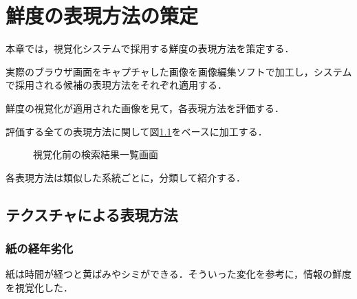 \chapter{鮮度の表現方法の策定}
\label{chap:verification}

本章では，視覚化システムで採用する鮮度の表現方法を策定する．

実際のブラウザ画面をキャプチャした画像を画像編集ソフトで加工し，システムで採用される候補の表現方法をそれぞれ適用する．

鮮度の視覚化が適用された画像を見て，各表現方法を評価する．

\newpage

評価する全ての表現方法に関して図\ref{fig:ver-base}をベースに加工する．

\begin{figure}[htbp]
  \begin{center}
  \end{center}
  \caption{視覚化前の検索結果一覧画面}
  \label{fig:ver-base}
\end{figure}

各表現方法は類似した系統ごとに，分類して紹介する．

\section{テクスチャによる表現方法}
\label{sec:ver-texture}

\subsection{紙の経年劣化}
\label{subsec:ver-tex-sheet}

紙は時間が経つと黄ばみやシミができる．そういった変化を参考に，情報の鮮度を視覚化した．

